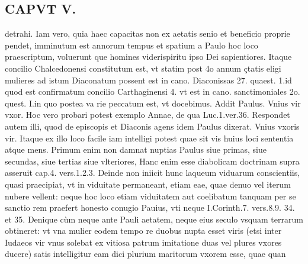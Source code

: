 \documentclass{article}
\begin{document}
\begin{pages}
\section*{CAPVT  V. } detrahi. Iam vero, quia haec capacitas non ex aetatis senio et beneficio proprie pendet, imminutum est annorum tempus et spatium a Paulo hoc loco praescriptum, voluerunt que homines viderispiritu ipso Dei sapientiores. Itaque concilio Chalcedonensi constitutum est, vt statim post 4o annum çtatis eligi mulieres ad istum Diaconatum possent est in cano. Diaconissas 27. quaest. 1.id quod est confirmatum concilio Carthaginensi 4. vt est in cano. sanctimoniales 2o. quest. I.in quo postea va rie peccatum est, vt docebimus.  \pend\pstart Addit Paulus. Vnius vir vxor. Hoc vero probari potest exemplo Annae, de qua Luc.1.ver.36. Respondet autem illi, quod de episcopis et Diaconis agens idem Paulus dixerat. Vnius vxoris vir. Itaque ex illo loco facile iam intelligi potest quae sit vis huius loci sententia atque mens. Primum enim non damnat nuptias Paulus siue primas, siue secundas, siue tertias siue vlteriores, Hanc enim esse diabolicam doctrinam supra asseruit cap.4. vers.1.2.3. Deinde non iniicit hunc laqueum viduarum conscientiis, quasi praecipiat, vt in viduitate permaneant, etiam eae, quae denuo vel iterum nubere vellent: neque hoc loco etiam viduitatem aut coelibatum tanquam per se sanctio rem praefert honesto conugio Pauius, vti neque I.Corinth.7. vers.8.9. 34. et 35. Denique cùm neque ante Pauli aetatem, neque eius seculo vsquam terrarum obtineret: vt vna mulier eodem tempo re duobus nupta esset viris (etsi inter Iudaeos vir vnus solebat ex vitiosa patrum imitatione duas vel plures vxores ducere) satis intelligitur eam dici plurium maritorum vxorem esse, quae quan\pend

\end{pages}
\end{document}
